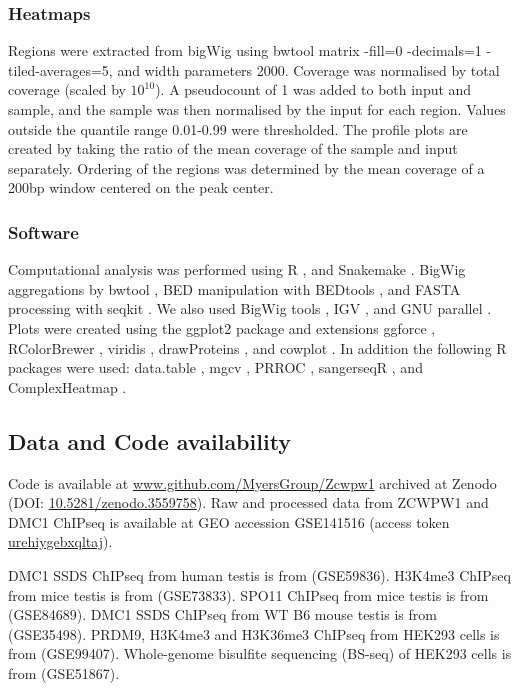 \subsubsection{Heatmaps}
\label{sec:heatmaps}
Regions were extracted from bigWig using bwtool matrix -fill=0 -decimals=1 -tiled-averages=5, and width parameters 2000. Coverage was normalised by total coverage (scaled by $10^{10}$). A pseudocount of 1 was added to both input and sample, and the sample was then normalised by the input for each region. Values outside the quantile range 0.01-0.99 were thresholded. The profile plots are created by taking the ratio of the mean coverage of the sample and input separately. Ordering of the regions was determined by the mean coverage of a 200bp window centered on the peak center.

\subsubsection{Software}
Computational analysis was performed using R \parencite{RCoreTeam2018Language}, and Snakemake \parencite{Koster2012Snakemake}. BigWig aggregations by bwtool \parencite{Pohl2014bwtool}, BED manipulation with BEDtools \parencite{Quinlan2010BEDTools}, and FASTA processing with seqkit \parencite{Shen2016SeqKit}. We also used BigWig tools \parencite{Kent2010BigWig}, IGV \parencite{Thorvaldsdottir2013Integrative}, and GNU parallel \parencite{Tange2011GNU}. Plots were created using the ggplot2 package \parencite{Wickham2016ggplot2} and extensions ggforce \parencite{Pedersen2016ggforce}, RColorBrewer \parencite{Neuwirth2014RColorBrewer}, viridis \parencite{Garnier2018viridis}, drawProteins \parencite{Brennan2018drawProteins}, and cowplot \parencite{Wilke2018cowplot}. In addition the following R packages were used: data.table \parencite{Dowle2019data}, mgcv \parencite{Wood2011Fast}, PRROC \parencite{Grau2015PRROC}, sangerseqR \parencite{Hill2014Poly}, and ComplexHeatmap \parencite{Gu2016Complex}.

\subsection{Data and Code availability}
Code is available at \url{www.github.com/MyersGroup/Zcwpw1} archived at Zenodo (DOI: \href{http://www.doi.org/10.5281/zenodo.3559758}{10.5281/zenodo.3559758}). Raw and processed data from ZCWPW1 and DMC1 ChIPseq is available at GEO accession GSE141516 (access token \url{urehiygebxqltaj}).

DMC1 SSDS ChIPseq from human testis is from \parencite{Pratto2014DNA} (GSE59836). H3K4me3 ChIPseq from mice testis is from \parencite{Davies2016Reengineering} (GSE73833). SPO11 ChIPseq from mice testis is from \parencite{Lange2016Landscape} (GSE84689). DMC1 SSDS ChIPseq from WT B6 mouse testis is from \parencite{Brick2012Genetic} (GSE35498). PRDM9, H3K4me3 and H3K36me3 ChIPseq from HEK293 cells is from \parencite{Altemose2017map} (GSE99407). Whole-genome bisulfite sequencing (BS-seq) of HEK293 cells is from \parencite{Libertini2015Overexpression} (GSE51867).

